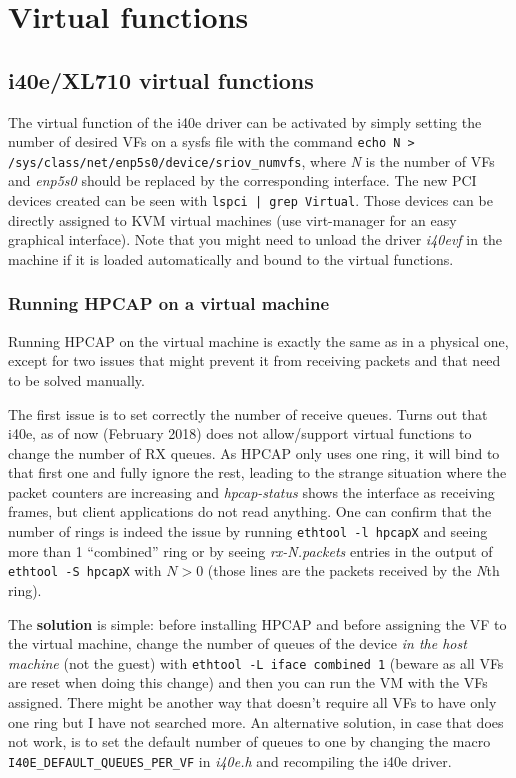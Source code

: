 \chapter{Virtual functions}

\section{i40e/XL710 virtual functions}

The virtual function of the i40e driver can be activated by simply setting the number of desired VFs on a sysfs file with the command \texttt{echo N > /sys/class/net/enp5s0/device/sriov\_numvfs}, where \textit{N} is the number of VFs and \textit{enp5s0} should be replaced by the corresponding interface. The new PCI devices created can be seen with \texttt{lspci | grep Virtual}. Those devices can be directly assigned to KVM virtual machines (use virt-manager for an easy graphical interface). Note that you might need to unload the driver \textit{i40evf} in the machine if it is loaded automatically and bound to the virtual functions.

\subsection{Running HPCAP on a virtual machine}

Running HPCAP on the virtual machine is exactly the same as in a physical one, except for two issues that might prevent it from receiving packets and that need to be solved manually.

The first issue is to set correctly the number of receive queues. Turns out that i40e, as of now (February 2018) does not allow/support virtual functions to change the number of RX queues. As HPCAP only uses one ring, it will bind to that first one and fully ignore the rest, leading to the strange situation where the packet counters are increasing and \textit{hpcap-status} shows the interface as receiving frames, but client applications do not read anything. One can confirm that the number of rings is indeed the issue by running \texttt{ethtool -l hpcapX} and seeing more than 1 ``combined'' ring or by seeing \textit{rx-N.packets} entries in the output of \texttt{ethtool -S hpcapX} with $N > 0$ (those lines are the packets received by the \textit{N}th ring).

The \textbf{solution} is simple: before installing HPCAP and before assigning the VF to the virtual machine, change the number of queues of the device \textit{in the host machine} (not the guest) with \texttt{ethtool -L iface combined 1} (beware as all VFs are reset when doing this change) and then you can run the VM with the VFs assigned. There might be another way that doesn't require all VFs to have only one ring but I have not searched more. An alternative solution, in case that does not work, is to set the default number of queues to one by changing the macro \texttt{I40E\_DEFAULT\_QUEUES\_PER\_VF} in \textit{i40e.h} and recompiling the i40e driver.


